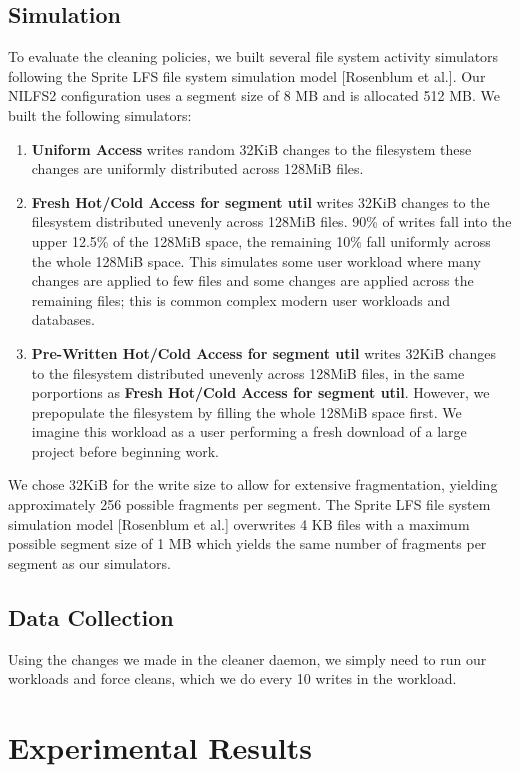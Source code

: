 \documentclass[12pt]{article}
\begin{document}
\subsection{Simulation}
To evaluate the cleaning policies, we built several file system activity simulators following the Sprite LFS file system simulation model [Rosenblum et al.]. Our NILFS2 configuration uses a segment size of 8 MB and is allocated 512 MB. We built the following simulators:  
\begin{enumerate}
    \item \textbf{Uniform Access} writes random 32KiB changes to the filesystem these changes are uniformly distributed across 128MiB files.
    \item \textbf{Fresh Hot/Cold Access for segment util} writes 32KiB changes to the filesystem distributed unevenly across 128MiB files. 90\% of writes fall into the upper 12.5\% of the 128MiB space, the remaining 10\% fall uniformly across the whole 128MiB space. This simulates some user workload where many changes are applied to few files and some changes are applied across the remaining files; this is common complex modern user workloads and databases.
    \item \textbf{Pre-Written Hot/Cold Access for segment util} writes 32KiB changes to the filesystem distributed unevenly across 128MiB files, in the same porportions as \textbf{Fresh Hot/Cold Access for segment util}. However, we prepopulate the filesystem by filling the whole 128MiB space first. We imagine this workload as a user performing a fresh download of a large project before beginning work. 
\end{enumerate}
We chose 32KiB for the write size to allow for extensive fragmentation, yielding approximately 256 possible fragments per segment. The Sprite LFS file system simulation model [Rosenblum et al.] overwrites 4 KB files with a maximum possible segment size of 1 MB which yields the same number of fragments per segment as our simulators. 

\subsection{Data Collection}
Using the changes we made in the cleaner daemon, we simply need to run our workloads and force cleans, which we do every 10 writes in the workload.

\section{Experimental Results}
\end{document}
